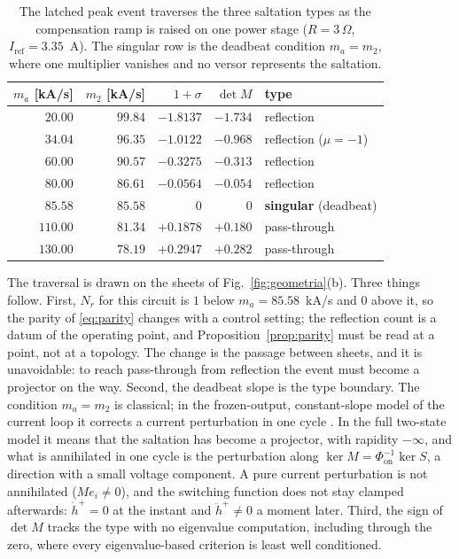 \documentclass[journal]{IEEEtran}
\begin{document}
\begin{table}[!t]
\caption{The latched peak event traverses the three saltation types as the
compensation ramp is raised on one power stage ($R=3\,\Omega$,
$I_{\mathrm{ref}}=3.35$~A). The singular row is the deadbeat condition
$m_a=m_2$, where one multiplier vanishes and no versor represents the
saltation.}
\label{tab:especies}
\centering
\setlength{\tabcolsep}{3.5pt}
\begin{tabular}{@{}rrrrl@{}}
\toprule
$m_a$ [kA/s] & $m_2$ [kA/s] & $1+\sigma$ & $\det M$ & type \\
\midrule
$20.00$ & $99.84$ & $-1.8137$ & $-1.734$   & reflection \\
$34.04$ & $96.35$ & $-1.0122$ & $-0.968$   & reflection ($\mu=-1$) \\
$60.00$ & $90.57$ & $-0.3275$ & $-0.313$   & reflection \\
$80.00$ & $86.61$ & $-0.0564$ & $-0.054$   & reflection \\
$85.58$ & $85.58$ & $\ \ \ 0$ & $\ \ \ 0$  & \textbf{singular} (deadbeat) \\
$110.00$ & $81.34$ & $+0.1878$ & $+0.180$  & pass-through \\
$130.00$ & $78.19$ & $+0.2947$ & $+0.282$  & pass-through \\
\bottomrule
\end{tabular}
\end{table}

The traversal is drawn on the sheets of Fig.~\ref{fig:geometria}(b). Three
things follow. First, $N_r$ for this circuit is $1$ below $m_a=85.58$~kA/s
and $0$ above it, so the parity of \eqref{eq:parity} changes with a control
setting; the reflection count is a datum of the operating point, and
Proposition~\ref{prop:parity} must be read at a point, not at a topology.
The change is the passage between sheets, and it is unavoidable: to reach
pass-through from reflection the event must become a projector on the way.
Second, the deadbeat slope is the type boundary. The condition $m_a=m_2$
is classical; in the frozen-output, constant-slope model of the current loop
it corrects a current perturbation in one cycle
\cite{ridley1991new,erickson2020fundamentals}. In the full two-state model it
means that the saltation has become a projector, with rapidity $-\infty$,
and what is annihilated in one cycle is the perturbation along
$\ker M=\Phi_{\mathrm{on}}^{-1}\ker S$, a direction with a small voltage
component. A pure current perturbation is not annihilated ($Me_i\neq0$), and
the switching function does not stay clamped afterwards: $\dot h^{+}=0$ at
the instant and $\ddot h^{+}\neq0$ a moment later. Third, the sign of
$\det M$ tracks the type with no eigenvalue computation, including
through the zero, where every eigenvalue-based criterion is least well
conditioned.
\end{document}
